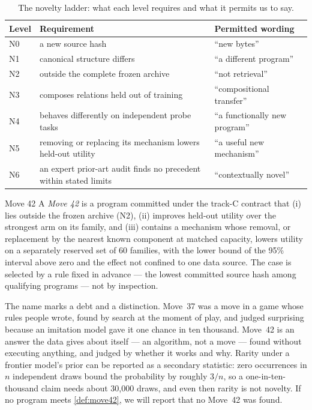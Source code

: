\begin{table}[t]
\caption{The novelty ladder: what each level requires and what it permits us to say.}
\label{tab:novelty}
\centering\sffamily\footnotesize\lining
\begin{tabularx}{\linewidth}{@{}lLL@{}}
\toprule
Level & Requirement & Permitted wording \\
\midrule
N0 & a new source hash & ``new bytes'' \\
N1 & canonical structure differs & ``a different program'' \\
N2 & outside the complete frozen archive & ``not retrieval'' \\
N3 & composes relations held out of training & ``compositional transfer'' \\
N4 & behaves differently on independent probe tasks & ``a functionally new program'' \\
N5 & removing or replacing its mechanism lowers held-out utility & ``a useful new mechanism'' \\
N6 & an expert prior-art audit finds no precedent within stated limits & ``contextually novel'' \\
\bottomrule
\end{tabularx}
\end{table}

\begin{definition}{Move 42}
\label{def:move42}
A \emph{Move 42} is a program committed under the track-C contract that (i) lies outside the frozen
archive (N2), (ii) improves held-out utility over the strongest arm on its family, and (iii) contains
a mechanism whose removal, or replacement by the nearest known component at matched capacity, lowers
utility on a separately reserved set of 60 families, with the lower bound of the 95\% interval above
zero and the effect not confined to one data source. The case is selected by a rule fixed in
advance --- the lowest committed source hash among qualifying programs --- not by inspection.
\end{definition}

The name marks a debt and a distinction. Move~37 was a move in a game whose rules people wrote, found
by search at the moment of play, and judged surprising because an imitation model gave it one chance
in ten thousand. Move~42 is an answer the data gives about itself --- an algorithm, not a move --- found
without executing anything, and judged by whether it works and why. Rarity under a frontier model's
prior can be reported as a secondary statistic: zero occurrences in $n$ independent draws bound the
probability by roughly $3/n$, so a one-in-ten-thousand claim needs about 30,000 draws, and even then
rarity is not novelty. If no program meets \cref{def:move42}, we will report that no Move~42 was
found.

